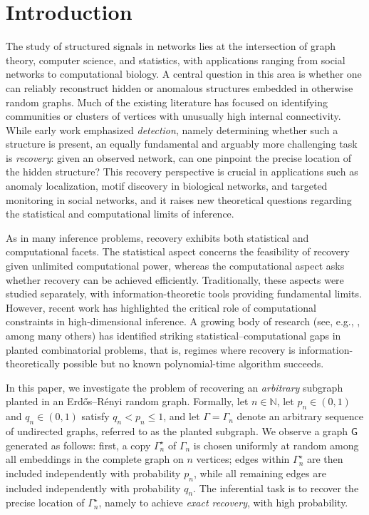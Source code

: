 \documentclass[12pt]{article}
\newcommand{\s}[1]{\mathsf{#1}}
\begin{document}

\section{Introduction}\label{sec:intro}

The study of structured signals in networks lies at the intersection of graph theory, computer science, and statistics, with applications ranging from social networks to computational biology. A central question in this area is whether one can reliably reconstruct hidden or anomalous structures embedded in otherwise random graphs. Much of the existing literature has focused on identifying communities or clusters of vertices with unusually high internal connectivity. While early work emphasized \emph{detection}, namely determining whether such a structure is present, an equally fundamental and arguably more challenging task is \emph{recovery}: given an observed network, can one pinpoint the precise location of the hidden structure? This recovery perspective is crucial in applications such as anomaly localization, motif discovery in biological networks, and targeted monitoring in social networks, and it raises new theoretical questions regarding the statistical and computational limits of inference.

As in many inference problems, recovery exhibits both statistical and computational facets. The statistical aspect concerns the feasibility of recovery given unlimited computational power, whereas the computational aspect asks whether recovery can be achieved efficiently. Traditionally, these aspects were studied separately, with information-theoretic tools providing fundamental limits. However, recent work has highlighted the critical role of computational constraints in high-dimensional inference. A growing body of research (see, e.g., \cite{berthet2013complexity,ma2015computational,cai2015computational,chen2016statistical,hopkins2017bayesian,Hopkins18,gamarnik2020lowdegree,barak2016nearly,Lenka16,Lesieur_2015,hajek2015computational,bandeira2018notes,brennan18a,brennan19,brennan20a}, among many others) has identified striking statistical--computational gaps in planted combinatorial problems, that is, regimes where recovery is information-theoretically possible but no known polynomial-time algorithm succeeds.

In this paper, we investigate the problem of recovering an \emph{arbitrary} subgraph planted in an Erd\H{o}s--R\'enyi random graph. Formally, let $n \in \mathbb{N}$, let $p_n \in (0,1)$ and $q_n \in (0,1)$ satisfy $q_n < p_n \leq 1$, and let $\Gamma = \Gamma_n$ denote an arbitrary sequence of undirected graphs, referred to as the planted subgraph. We observe a graph $\s{G}$ generated as follows: first, a copy $\Gamma_n^\star$ of $\Gamma_n$ is chosen uniformly at random among all embeddings in the complete graph on $n$ vertices; edges within $\Gamma_n^\star$ are then included independently with probability $p_n$, while all remaining edges are included independently with probability $q_n$. The inferential task is to recover the precise location of $\Gamma_n^\star$, namely to achieve \emph{exact recovery}, with high probability.
\end{document}
